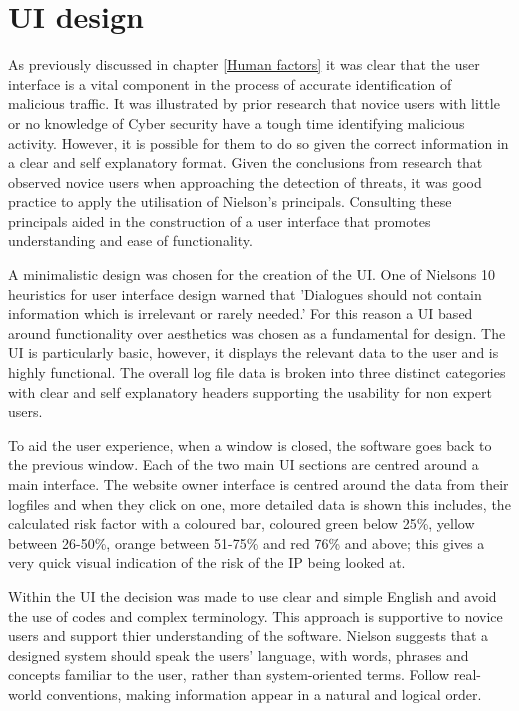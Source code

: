 \section{UI design} \label{ui}

As previously discussed in chapter \ref{Human factors} it was clear that the user interface is a vital component in the process of accurate identification of malicious traffic. It was illustrated by prior research that novice users with little or no knowledge of Cyber security have a tough time identifying malicious activity. However, it is possible for them to do so given the correct information in a clear and self explanatory format. Given the conclusions from research that observed novice users when approaching the detection of threats, it was good practice to apply the utilisation of Nielson's principals. Consulting these principals aided in the construction of a user interface that promotes understanding and ease of functionality.

A minimalistic design was chosen for the creation of the UI. One of Nielsons 10 heuristics for user interface design warned that 'Dialogues should not contain information which is irrelevant or rarely needed.' For this reason a UI based around functionality over aesthetics was chosen as a fundamental for design. The UI is particularly basic, however, it displays the relevant data to the user and is highly functional. The overall log file data is broken into three distinct categories with clear and self explanatory headers supporting the usability for non expert users.

To aid the user experience, when a window is closed, the software goes back to the previous window. Each of the two main UI sections are centred around a main interface. The website owner interface is centred around the data from their logfiles and when they click on one, more detailed data is shown this includes, the calculated risk factor with a coloured bar, coloured green below 25\%, yellow between 26-50\%, orange between 51-75\% and red 76\% and above; this gives a very quick visual indication of the risk of the IP being looked at. 

Within the UI the decision was made to use clear and simple English and avoid the use of codes and complex terminology. This approach is supportive to novice users and support thier understanding of the software. Nielson suggests that a designed system should speak the users' language, with words, phrases and concepts familiar to the user, rather than system-oriented terms. Follow real-world conventions, making information appear in a natural and logical order.

